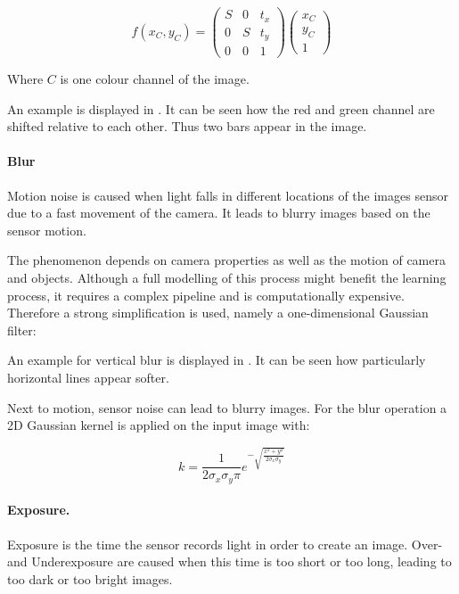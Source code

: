 \begin{equation}
f(x_C,y_C) = \begin{pmatrix}
S & 0 & t_x \\
0 & S & t_y \\
0 & 0 & 1
\end{pmatrix} \begin{pmatrix}
x_C \\
y_C \\
1
\end{pmatrix}
\end{equation}

Where $C$ is one colour channel of the image.

An example is displayed in . It can be seen how the red and green channel are shifted relative to each other. Thus two bars appear in the image.

\paragraph{Blur}

Motion noise is caused when light falls in different locations of the images sensor due to a fast movement of the camera. It leads to blurry images based on the sensor motion.

The phenomenon depends on camera properties as well as the motion of camera and objects. Although a full modelling of this process might benefit the learning process, it requires a complex pipeline and is computationally expensive. Therefore a strong simplification is used, namely a one-dimensional Gaussian filter:

An example for vertical blur is displayed in . It can be seen how particularly horizontal lines appear softer.

Next to motion, sensor noise can lead to blurry images. For the blur operation a 2D Gaussian kernel is applied on the input image with:

\begin{equation}
k = \frac{1}{2\sigma_x\sigma_y\pi}e^{-\sqrt{\frac{x^2 + y^2}{2\sigma_x\sigma_y}}} 
\end{equation}
\paragraph{Exposure.}

Exposure is the time the sensor records light in order to create an image. Over- and Underexposure are caused when this time is too short or too long, leading to too dark or too bright images.

